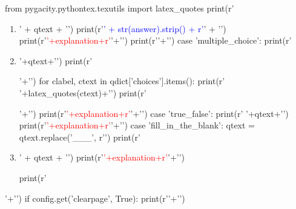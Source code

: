 \begin{pycode}
from pygacity.pythontex.texutils import latex_quotes
print(r'\begin{enumerate}'+'\n')
for iidx, qdict in enumerate(questions):
    iidx_char = str(iidx+1) if first_ordinal == 1 else chr(ord(first_ordinal)+iidx)
    qtext = latex_quotes(qdict['Q'])
    answer = qdict['A']
    explanation = latex_quotes(qdict.get('text', ''))
    qtype = qdict.get('T', global_qtype)
    match qtype:
        case 'short_answer':
            print(r'\item[' + iidx_char + '.] ' + qtext + '\n')
            print(r'\ifshowsolutions\textcolor{blue}{' + str(answer).strip() + r'}' + '\n')
            print(r'\textcolor{red}{'+explanation+r'}'+'\n')
            print(r'\else\vspace{1.4cm}\fi'+'\n')
        case 'multiple_choice':
            print(r'\item['+iidx_char+r'.] '+qtext+'\n')
            print(r'\begin{itemize}'+'\n')
            for clabel, ctext in qdict['choices'].items():
                print(r' '+latex_quotes(ctext)+'\n')
            print(r'\end{itemize}'+'\n')
            print(r'\ifshowsolutions\textcolor{red}{'+explanation+r'}\fi'+'\n')
        case 'true_false':
            print(r' '+qtext+'\n')
            print(r'\ifshowsolutions\textcolor{red}{'+explanation+r'}\fi'+'\n')
        case 'fill_in_the_blank':
            qtext = qtext.replace('___', r'')
            print(r'\item[' + iidx_char + '.] ' + qtext + '\n')
            print(r'\ifshowsolutions\textcolor{red}{'+explanation+r'}\fi'+'\n')

print(r'\end{enumerate}'+'\n')
if config.get('clearpage', True):
    print(r'\clearpage'+'\n')
\end{pycode}


